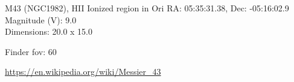 \begin{block}{M43 (NGC1982), HII Ionized region in Ori}
    RA: 05:35:31.38, Dec: -05:16:02.9 \\ 
    Magnitude (V): 9.0 \\ 
    Dimensions: 20.0 x 15.0 

    Finder fov: 60 

    \url{https://en.wikipedia.org/wiki/Messier_43} 
\end{block}